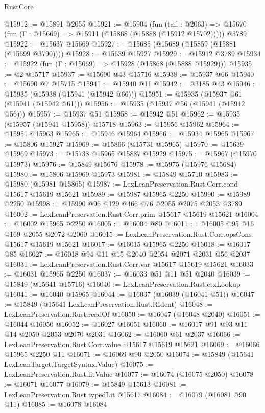 \begin{lexlean}{RustCore}
\begin{coremodule}
@15912 := @15891 @2055
@15921 := @15904
    (fun (tail : @2063) => @15670 (fun (Γ : @15669) => @15911 (@15868 (@15888 (@15912 @15702)))))
    @3789
@15922 := @15637 @15669
@15927 := @15685 (@15689 (@15859 (@15881 (@15699 @3790))))
@15928 := @15639 @15927
@15929 := @15912 @3789
@15934 := @15922 (fun (Γ : @15669) => @15928 (@15868 (@15888 @15929)))
@15935 := @2 @15717
@15937 := @15690 @43 @15716
@15938 := @15937 @66
@15940 := @15690 @7 @15715
@15941 := @15940 @11
@15942 := @3185 @43
@15946 := @15935 (@15938 (@15941 (@15942 @66)))
@15951 := @15935 (@15937 @61 (@15941 (@15942 @61)))
@15956 := @15935 (@15937 @56 (@15941 (@15942 @56)))
@15957 := @15937 @51
@15958 := @15942 @51
@15962 := @15935 (@15957 (@15941 @15958)) @15718
@15963 := @15956 @15962
@15964 := @15951 @15963
@15965 := @15946 @15964
@15966 := @15934 @15965
@15967 := @15806 @15927
@15969 := @15866 (@15731 @15965)
@15970 := @15639 @15969
@15973 := @15738 @15965 @15887 @15929
@15975 := @15967 (@15970 @15973)
@15976 := @15849 @15676
@15978 := @15975 (@15976 @15684)
@15980 := @15806 @15969 @15973
@15981 := @15849 @15710
@15983 := @15980 (@15981 @15865)
@15987 := LexLeanPreservation.Rust.Corr.cond @15617 @15619 @15621
@15989 := @15987 @15965 @2250
@15990 := @15989 @2250
@15998 := @15990 @96 @129 @466 @76 @2055 @2075 @2053 @3789
@16002 := LexLeanPreservation.Rust.Corr.prim @15617 @15619 @15621
@16004 := @16002 @15965 @2250
@16005 := @16004 @80
@16011 := @16005 @95 @16 @169 @2055 @2072 @2060
@16015 := LexLeanPreservation.Rust.Corr.opsCons @15617 @15619 @15621
@16017 := @16015 @15965 @2250
@16018 := @16017 @85
@16027 := @16018 @94 @11 @15 @2040 @2054 @2071 @2031 @56 @2037
@16031 := LexLeanPreservation.Rust.Corr.var @15617 @15619 @15621
@16033 := @16031 @15965 @2250
@16037 := @16033 @51 @11 @51 @2040
@16039 := @15849 (@15641 @15716)
@16040 := LexLeanPreservation.Rust.ctxLookup
@16041 := @16040 @15965
@16044 := @16037 (@16039 (@16041 @51))
@16047 := @15849 (@15641 LexLeanPreservation.Rust.RIdent)
@16048 := LexLeanPreservation.Rust.readOf
@16050 := @16047 (@16048 @2040)
@16051 := @16044 @16050
@16052 := @16027 @16051
@16060 := @16017 @91 @93 @11 @14 @2050 @2053 @2070 @2031
@16062 := @16060 @61 @2037
@16066 := LexLeanPreservation.Rust.Corr.value @15617 @15619 @15621
@16069 := @16066 @15965 @2250 @11
@16071 := @16069 @90 @2050
@16074 := @15849 (@15641 LexLeanTarget.TargetSyntax.Value)
@16075 := LexLeanPreservation.Rust.litValue
@16077 := @16074 (@16075 @2050)
@16078 := @16071 @16077
@16079 := @15849 @15613
@16081 := LexLeanPreservation.Rust.typedLit @15617
@16084 := @16079 (@16081 @90 @11)
@16085 := @16078 @16084

\end{coremodule}
\end{lexlean}
